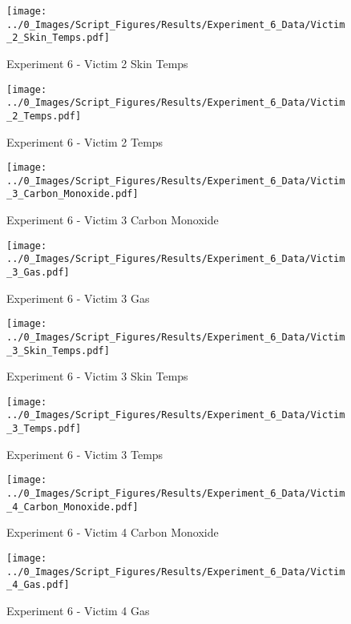 	\clearpage

	\begin{figure}[H]
		\centering
		\texttt{[image: ../0\_Images/Script\_Figures/Results/Experiment\_6\_Data/Victim\_2\_Skin\_Temps.pdf]}
		\caption[]{Experiment 6 - Victim 2 Skin Temps}
	\end{figure}
 

	\begin{figure}[H]
		\centering
		\texttt{[image: ../0\_Images/Script\_Figures/Results/Experiment\_6\_Data/Victim\_2\_Temps.pdf]}
		\caption[]{Experiment 6 - Victim 2 Temps}
	\end{figure}
 
	\clearpage

	\begin{figure}[H]
		\centering
		\texttt{[image: ../0\_Images/Script\_Figures/Results/Experiment\_6\_Data/Victim\_3\_Carbon\_Monoxide.pdf]}
		\caption[]{Experiment 6 - Victim 3 Carbon Monoxide}
	\end{figure}
 

	\begin{figure}[H]
		\centering
		\texttt{[image: ../0\_Images/Script\_Figures/Results/Experiment\_6\_Data/Victim\_3\_Gas.pdf]}
		\caption[]{Experiment 6 - Victim 3 Gas}
	\end{figure}
 
	\clearpage

	\begin{figure}[H]
		\centering
		\texttt{[image: ../0\_Images/Script\_Figures/Results/Experiment\_6\_Data/Victim\_3\_Skin\_Temps.pdf]}
		\caption[]{Experiment 6 - Victim 3 Skin Temps}
	\end{figure}
 

	\begin{figure}[H]
		\centering
		\texttt{[image: ../0\_Images/Script\_Figures/Results/Experiment\_6\_Data/Victim\_3\_Temps.pdf]}
		\caption[]{Experiment 6 - Victim 3 Temps}
	\end{figure}
 
	\clearpage

	\begin{figure}[H]
		\centering
		\texttt{[image: ../0\_Images/Script\_Figures/Results/Experiment\_6\_Data/Victim\_4\_Carbon\_Monoxide.pdf]}
		\caption[]{Experiment 6 - Victim 4 Carbon Monoxide}
	\end{figure}
 

	\begin{figure}[H]
		\centering
		\texttt{[image: ../0\_Images/Script\_Figures/Results/Experiment\_6\_Data/Victim\_4\_Gas.pdf]}
		\caption[]{Experiment 6 - Victim 4 Gas}
	\end{figure}
 
